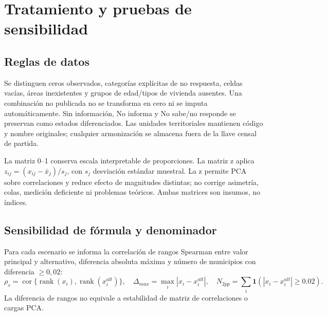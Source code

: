 \documentclass[11pt,a4paper]{article}
\begin{document}
\section{Tratamiento y pruebas de sensibilidad}

\subsection{Reglas de datos}

Se distinguen ceros observados, categorías explícitas de no respuesta, celdas vacías, áreas inexistentes y grupos de edad/tipos de vivienda ausentes. Una combinación no publicada no se transforma en cero ni se imputa automáticamente. Sin información, No informa y No sabe/no responde se preservan como estados diferenciados. Las unidades territoriales mantienen código y nombre originales; cualquier armonización se almacena fuera de la llave censal de partida.

La matriz 0--1 conserva escala interpretable de proporciones. La matriz z aplica $z_{ij}=(x_{ij}-\bar{x}_j)/s_j$, con $s_j$ desviación estándar muestral. La z permite PCA sobre correlaciones y reduce efecto de magnitudes distintas; no corrige asimetría, colas, medición deficiente ni problemas teóricos. Ambas matrices son insumos, no índices.

\subsection{Sensibilidad de fórmula y denominador}

Para cada escenario se informa la correlación de rangos Spearman entre valor principal y alternativo, diferencia absoluta máxima y número de municipios con diferencia $\geq 0,02$:
\begin{equation}
\rho_s=\operatorname{cor}\{\operatorname{rank}(x_i),\operatorname{rank}(x_i^{alt})\},\quad
\Delta_{max}=\max_i|x_i-x_i^{alt}|,\quad
N_{2pp}=\sum_i\mathbf{1}(|x_i-x_i^{alt}|\geq0.02).
\end{equation}
La diferencia de rangos no equivale a estabilidad de matriz de correlaciones o cargas PCA.
\end{document}
